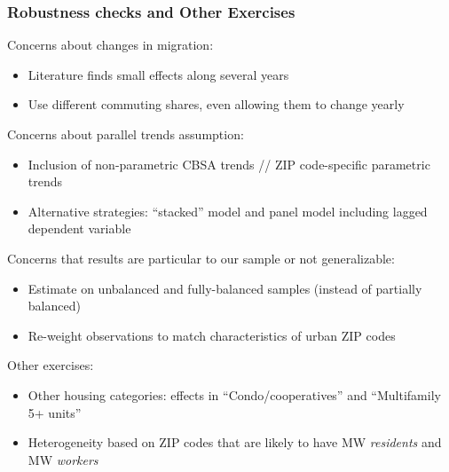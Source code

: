 \documentclass[aspectratio=169, t]{beamer}
\begin{document}
\begin{frame}[label = robustness]
    \frametitle{Robustness checks and Other Exercises}

    Concerns about changes in migration:
    \begin{itemize} \small
        \item Literature finds small effects along several years {\small\color{gray}\parencite[e.g.,][]{PerezPerez2021}}
        \item Use different commuting shares, even allowing them to change yearly
        
    \end{itemize}

    \pause
    \vspace{1.5mm}
    Concerns about parallel trends assumption:
    \begin{itemize} \small
        \item Inclusion of non-parametric CBSA trends // ZIP code-specific parametric trends
        \item Alternative strategies: ``stacked'' model and panel model including lagged dependent variable 
        {\color{gray} \parencite{ArellanoBond1991}}
    \end{itemize}

    \pause
    \vspace{1.5mm}
    Concerns that results are particular to our sample or not generalizable:
    \begin{itemize} \small
        \item Estimate on unbalanced and fully-balanced samples (instead of partially balanced)
        \item Re-weight observations to match characteristics of urban ZIP codes
    \end{itemize}
    
    \pause
    \vspace{1.5mm}
    Other exercises:
    \begin{itemize} \small
        \item Other housing categories: effects in ``Condo/cooperatives'' and ``Multifamily 5+ units''
        \item Heterogeneity based on ZIP codes that are likely to have MW \textit{residents} 
        and MW \textit{workers}
    \end{itemize}
\end{frame}
\end{document}
